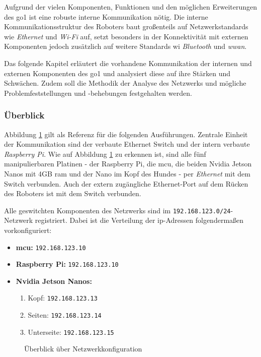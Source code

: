 Aufgrund der vielen Komponenten, Funktionen und den möglichen Erweiterungen des \gls{go1} ist eine robuste interne Kommunikation nötig.
Die interne Kommunikationsstruktur des Roboters baut großenteils auf Netzwerkstandards wie \emph{Ethernet} und \emph{Wi-Fi} auf,
setzt besonders in der Konnektivität mit externen Komponenten jedoch zusätzlich auf weitere Standards wi \emph{Bluetooth} und \emph{\gls{wwan}}.

Das folgende Kapitel erläutert die vorhandene Kommunikation der internen und externen Komponenten des \gls{go1} und analysiert diese
auf ihre Stärken und Schwächen.
Zudem soll die Methodik der Analyse des Netzwerks und mögliche Problemfeststellungen und -behebungen festgehalten werden.

\subsubsection{Überblick}

Abbildung \ref{fig:netzwerk_ueberblick} gilt als Referenz für die folgenden Ausführungen.
Zentrale Einheit der Kommunikation sind der verbaute Ethernet Switch  und
der intern verbaute \emph{Raspberry Pi}.
Wie auf Abbildung \ref{fig:netzwerk_ueberblick} zu erkennen ist, sind alle fünf manipulierbaren Platinen -
der Raspberry Pi, die \gls{mcu}, die beiden Nvidia Jetson Nanos mit \num{4}GB \gls{ram} und der Nano im Kopf des Hundes -
per \emph{Ethernet} mit dem Switch verbunden.
Auch der extern zugängliche Ethernet-Port auf dem Rücken des Roboters ist mit dem Switch verbunden.

Alle geswitchten Komponenten des Netzwerks sind im \texttt{192.168.123.0/24}-Netzwerk registriert.
Dabei ist die Verteilung der \gls{ip}-Adressen folgendermaßen vorkonfiguriert:
\begin{itemize}
    \item \textbf{\gls{mcu}:} \texttt{192.168.123.10}
    \item \textbf{Raspberry Pi:} \texttt{192.168.123.10}
    \item \textbf{Nvidia Jetson Nanos:}
    \begin{enumerate}
        \item Kopf: \texttt{192.168.123.13}
        \item Seiten: \texttt{192.168.123.14}
        \item Unterseite: \texttt{192.168.123.15}
    \end{enumerate}
\end{itemize}


\begin{figure}[h]
    \caption{Überblick über Netzwerkkonfiguration}\label{fig:netzwerk_ueberblick}
\end{figure}
